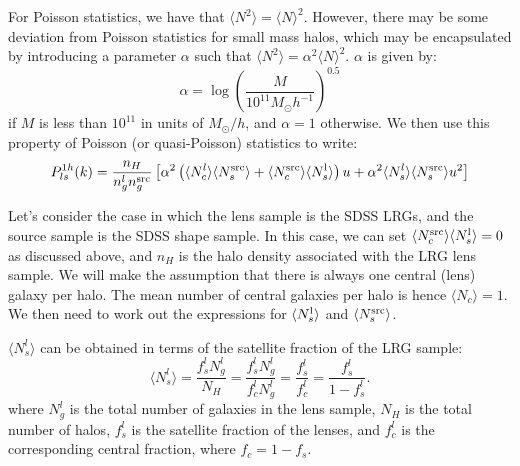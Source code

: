 \documentclass[onecolumn,amsmath,aps,fleqn, superscriptaddress]{revtex4}
\begin{document}
For Poisson statistics, we have that $\langle N^2 \rangle = \langle N \rangle^2$. However, there may be some deviation from Poisson statistics for small mass halos, which may be encapsulated by introducing a parameter $\alpha$ such that $\langle N^2 \rangle = \alpha^2\langle N \rangle^2$. $\alpha$ is given by:
\begin{equation}
\alpha = \log\left(\frac{M}{10^{11}M_\odot h^{-1}}\right)^{0.5}
\label{alpha}
\end{equation}
if $M$ is less than $10^{11}$ in units of $M_\odot / h$, and $\alpha=1$ otherwise. We then use this property of Poisson (or quasi-Poisson) statistics to write:
\begin{equation}
P_{ls}^{1h}(k) = \frac{n_H}{n_g^l n_g^{\rm src}}\left[\alpha^2 \left(\langle N_c^l \rangle \langle N_s^{\rm src} \rangle + \langle N_c^{\rm src}\rangle \langle N_s^{\rm l} \rangle\right) u + \alpha^2\langle N_s^l \rangle \langle N_s^{\rm src} \rangle u^2\right]
\label{1hpgg_Pois}
\end{equation}

Let's consider the case in which the lens sample is the SDSS LRGs, and the source sample is the SDSS shape sample. In this case, we can set $\langle N_c^{\rm src}\rangle \langle N_s^{\rm l} \rangle=0$ as discussed above, and $n_H$ is the halo density associated with the LRG lens sample. We will make the assumption that there is always one central (lens) galaxy per halo. The mean number of central galaxies per halo is hence $\langle N_c \rangle=1$. We then need to work out the expressions for $\langle N_s^{\rm l} \rangle$ and $\langle N_s^{\rm src} \rangle$.

$\langle N_s^l \rangle$ can be obtained in terms of the satellite fraction of the LRG sample:
\begin{equation}
\langle N_s^l \rangle = \frac{f_s^l N_g^l}{N_H} = \frac{f_s^l N_g^l}{f_c^l N_g^l} = \frac{f_s^l}{f_c^l} = \frac{f_s^l}{1-f_s^l}.
\label{Nsmean_lens}
\end{equation}
where $N_g^l$ is the total number of galaxies in the lens sample, $N_H$ is the total number of halos, $f_s^l$ is the satellite fraction of the lenses, and $f_c^l$ is the corresponding central fraction, where $f_c=1-f_s$.
\end{document}
